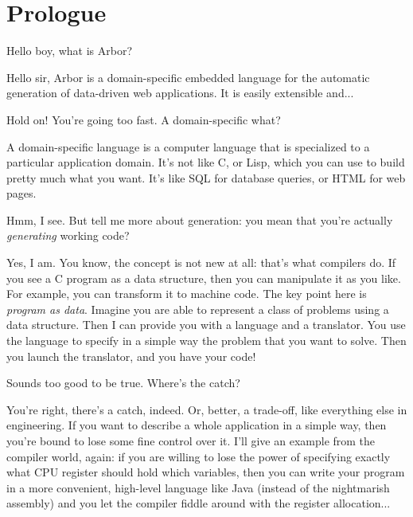 \documentclass[12pt]{article} %
\newcommand{\ddwa}{data-driven web application}
\newcommand{\dsel}{domain-specific embedded language}
\newcommand{\dsl}{domain-specific language}
\newcommand{\A}{Arbor}
\newenvironment{dialogue}{\list{---}{\itemsep=\parskip \topsep=\parskip \parsep=\parskip}}{\endlist}
\begin{document}

\tableofcontents %

\newpage %

\section{Prologue}
\begin{dialogue}
\item Hello boy, what is \A{}?
\item Hello sir, \A{} is a \dsel{} for the automatic generation of \ddwa{}s. It is easily extensible and...
\item Hold on! You're going too fast. A domain-specific what?
\item A \dsl{} is a computer language that is specialized to a particular application domain. It's not like C, or Lisp, which you can use to build pretty much what you want. It's like SQL for database queries, or HTML for web pages.
\item Hmm, I see. But tell me more about generation: you mean that you're actually \emph{generating} working code?
\item Yes, I am. You know, the concept is not new at all: that's what compilers do. If you see a C program as a data structure, then you can manipulate it as you like. For example, you can transform it to machine code. The key point here is \emph{program as data}. Imagine you are able to represent a class of problems using a data structure. Then I can provide you with a language and a translator. You use the language to specify in a simple way the problem that you want to solve. Then you launch the translator, and you have your code!
\item Sounds too good to be true. Where's the catch?
\item You're right, there's a catch, indeed. Or, better, a trade-off, like everything else in engineering. If you want to describe a whole application in a simple way, then you're bound to lose some fine control over it. I'll give an example from the compiler world, again: if you are willing to lose the power of specifying exactly what CPU register should hold which variables, then you can write your program in a more convenient, high-level language like Java (instead of the nightmarish assembly) and you let the compiler fiddle around with the register allocation...

\end{dialogue}
\end{document}
